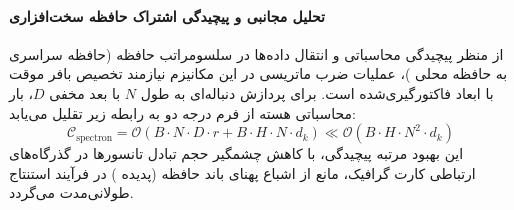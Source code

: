 \paragraph{تحلیل مجانبی و پیچیدگی اشتراک حافظه سخت‌افزاری}
از منظر پیچیدگی محاسباتی و انتقال داده‌ها در سلسومراتب حافظه (حافظه سراسری  به حافظه محلی )، عملیات ضرب ماتریسی در این مکانیزم نیازمند تخصیص بافر موقت با ابعاد فاکتورگیری‌شده است. برای پردازش دنباله‌ای به طول $N$ با بعد مخفی $D$، بار محاسباتی هسته از فرم درجه دو به رابطه زیر تقلیل می‌یابد:
\begin{equation}
\label{eq:complexity_spectron}
\mathcal{C}_{\text{spectron}} = \mathcal{O}\left( B \cdot N \cdot D \cdot r + B \cdot H \cdot N \cdot d_k \right) \ll \mathcal{O}\left( B \cdot H \cdot N^2 \cdot d_k \right)
\end{equation}
این بهبود مرتبه پیچیدگی، با کاهش چشمگیر حجم تبادل تانسورها در گذرگاه‌های ارتباطی کارت گرافیک، مانع از اشباع پهنای باند حافظه (پدیده ) در فرآیند استنتاج طولانی‌مدت می‌گردد.